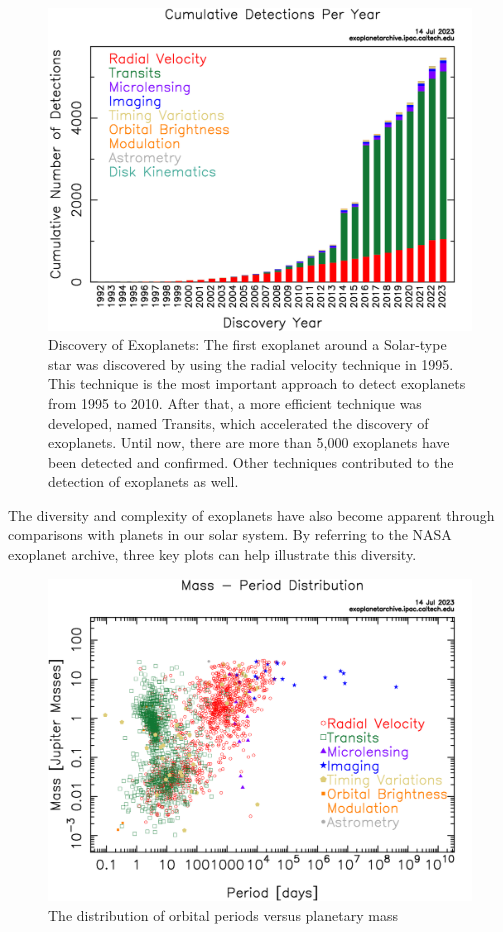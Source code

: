 \documentclass{article}
\begin{document}
\begin{figure}[H]
    \centering
    \includegraphics[width=1\linewidth]{image/dischist_cumulative.png}
    \captionsetup{font=small} 
    \caption{Discovery of Exoplanets: The first exoplanet around a Solar-type star was discovered by using the radial velocity technique in 1995. This technique is the most important approach to detect exoplanets from 1995 to 2010. After that, a more efficient technique was developed, named Transits, which accelerated the discovery of exoplanets. Until now, there are more than 5,000 exoplanets have been detected and confirmed. Other techniques contributed to the detection of exoplanets as well.}
    \label{fig:dischist_cumulative}
\end{figure}
\vspace{\baselineskip}
The diversity and complexity of exoplanets have also become apparent through comparisons with planets in our solar system. By referring to the NASA exoplanet archive, three key plots can help illustrate this diversity.

\begin{figure}[H]
    \centering
    \includegraphics[width=1\linewidth]{image/mass_period.png}
    \captionsetup{font=small} 
    \caption{The distribution of orbital periods versus planetary mass}
    \label{fig:mass_period}
\end{figure}
\end{document}
